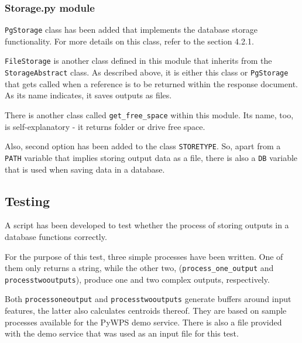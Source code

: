 \subsubsection{Storage.py module}

\texttt{PgStorage} class has been added that implements the
database storage functionality. For more details on this class,
refer to the section 4.2.1. 

\texttt{FileStorage} is another class defined in this module that inherits 
from \linebreak the \texttt{StorageAbstract} class. As described above, 
it is either this class or  \texttt{PgStorage} that gets called 
when a reference is to be returned within the response document. 
As its name indicates, it saves outputs as files.

There is another class called \texttt{get\_free\_space} within
this module. Its name, too, is self-explanatory - it returns
folder or drive free space.

Also, second option has been added to the class
\texttt{STORE\textunderscore TYPE}.  So, apart from a \texttt{PATH}
variable that implies storing output data as a file, there is also a
\texttt{DB} variable that is used when saving data in a database.

\subsection{Testing} 

A script has been developed to test whether the process of storing
outputs in a database functions correctly.

For the purpose of this test, three simple processes have been
written. One of them only returns a string, while the other two,
(\texttt{process\_one\_output} and \linebreak
\texttt{process\textunderscore two\textunderscore outputs}), produce
one and two complex outputs, respectively.

Both \texttt{process\textunderscore one\textunderscore output} and
\texttt{process\textunderscore two\textunderscore outputs} generate
buffers around input features, the latter also calculates centroids
thereof. They are based on sample processes available for the PyWPS
demo service. There is also a  file provided with the demo
service that was used as an input file for this test.

